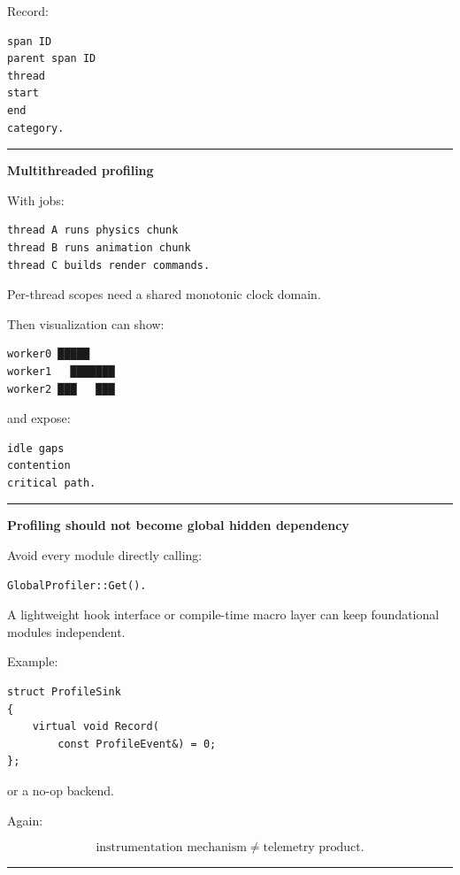 Record:

\begin{verbatim}
span ID
parent span ID
thread
start
end
category.
\end{verbatim}

\begin{center}\rule{0.5\linewidth}{0.5pt}\end{center}

\textbf{Multithreaded profiling}

With jobs:

\begin{verbatim}
thread A runs physics chunk
thread B runs animation chunk
thread C builds render commands.
\end{verbatim}

Per-thread scopes need a shared monotonic clock domain.

Then visualization can show:

\begin{verbatim}
worker0 █████
worker1   ███████
worker2 ███   ███
\end{verbatim}

and expose:

\begin{verbatim}
idle gaps
contention
critical path.
\end{verbatim}

\begin{center}\rule{0.5\linewidth}{0.5pt}\end{center}

\textbf{Profiling should not become global hidden dependency}

Avoid every module directly calling:

\begin{verbatim}
GlobalProfiler::Get().
\end{verbatim}

A lightweight hook interface or compile-time macro layer can keep foundational modules independent.

Example:

\begin{verbatim}
struct ProfileSink
{
    virtual void Record(
        const ProfileEvent&) = 0;
};
\end{verbatim}

or a no-op backend.

Again:

\[
\text{instrumentation mechanism}
\neq
\text{telemetry product}.
\]

\begin{center}\rule{0.5\linewidth}{0.5pt}\end{center}

